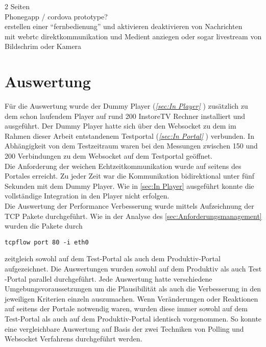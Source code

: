 2 Seiten \\
Phonegapp / cordova prototype?
\\erstellen einer "`fernbedienung"' und aktivieren deaktivieren von Nachrichten
\\mit webrtc direktkommunikation und Medient anziegen oder sogar livestream von Bildschrim oder Kamera

\section{Auswertung}
\label{sec:Auswertung}
Für die Auswertung wurde der Dummy Player (\textit{\ref{sec:In Player} }) zusätzlich zu dem schon laufendem Player auf rund 200 InstoreTV Rechner installiert und ausgeführt. Der Dummy Player hatte sich über den Websocket zu dem im Rahmen dieser Arbeit entstandenem Testportal (\textit{\ref*{sec:In Portal} }) verbunden. In Abhängigkeit von dem Testzeitraum waren bei den Messungen zwischen 150 und 200 Verbindungen zu dem Websocket auf dem Testportal geöffnet.
\\Die Anforderung der weichen Echtzeitkommunikation wurde auf seitens des Portales erreicht. Zu jeder Zeit war die Kommunikation bidirektional unter fünf Sekunden mit dem Dummy Player. Wie in \ref{sec:In Player}  ausgeführt konnte die vollständige Integration in den Player nicht erfolgen.
\\Die Auswertung der Performance Verbesserung wurde mittels Aufzeichnung der TCP Pakete durchgeführt. Wie in der Analyse des \ref{sec:Anforderungsmanagement}  wurden die Pakete durch
\begin{lstlisting}
tcpflow port 80 -i eth0
\end{lstlisting} zeitgleich sowohl auf dem Test-Portal als auch dem Produktiv-Portal aufgezeichnet. Die Auswertungen wurden sowohl auf dem Produktiv als auch Test -Portal parallel durchgeführt. Jede Auswertung hatte verschiedene Umgebungsvoraussetzungen um die Plausibilität als auch die Verbesserung in den jeweiligen Kriterien einzeln auszumachen. Wenn Veränderungen oder Reaktionen auf seitens der Portale notwendig waren, wurden diese immer sowohl auf dem Test-Portal als auch auf dem Produktiv-Portal identisch vorgenommen. So konnte eine vergleichbare Auswertung auf Basis der zwei Techniken von Polling und Websocket Verfahrens durchgeführt werden.
